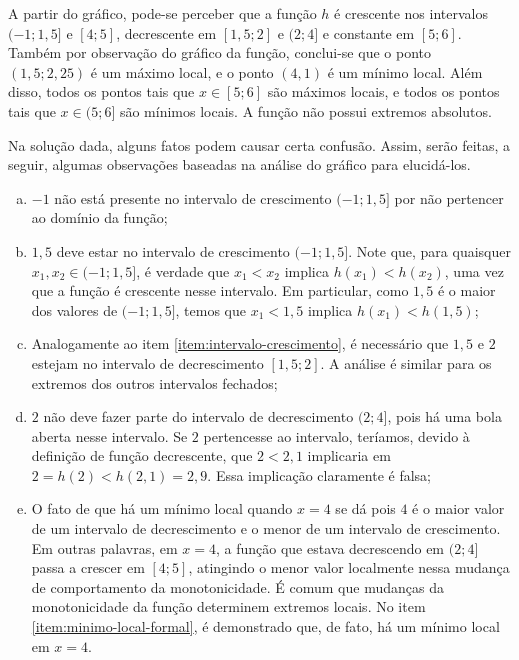 \begin{solution}
	A partir do gráfico, pode-se perceber que a função $h$ é crescente nos intervalos $(-1;1{,}5]$ e $[4;5]$,
	decrescente em $[1,5; 2]$ e $(2;4]$ e constante em $[5;6]$.     
	Também por observação do gráfico da função, conclui-se que o ponto $(1{,}5; 2{,}25)$ é um máximo local,
	e o ponto $(4,1)$ é um mínimo local. 
	Além disso, todos os pontos tais que $x \in [5;6]$ são máximos locais,
	e todos os pontos tais que $x \in (5; 6]$ são mínimos locais.
	A função não possui extremos absolutos.

	Na solução dada, alguns fatos podem causar certa confusão. 
	Assim, serão feitas, a seguir, algumas observações baseadas na análise do gráfico para elucidá-los.
	\begin{enumerate}[(a)]
		\item $-1$ não está presente no intervalo de crescimento $(-1;1{,}5]$ por não pertencer ao domínio da função;
		\item \label{item:intervalo-crescimento} $1{,}5$ deve estar no intervalo de crescimento $(-1;1{,}5]$. 
		Note que, para quaisquer $x_1, x_2 \in (-1;1{,}5]$, é verdade que $x_1 < x_2$ implica $h(x_1) < h(x_2)$,
		uma vez que a função é crescente nesse intervalo. 
		Em particular, como $1{,}5$ é o maior dos valores de $(-1;1{,}5]$, 
		temos que $x_1 < 1{,}5$ implica $h(x_1) < h(1{,}5)$;
		\item Analogamente ao item \ref{item:intervalo-crescimento},
		é necessário que $1{,}5$ e $2$ estejam no intervalo de decrescimento $[1,5; 2]$.
		A análise é similar para os extremos dos outros intervalos fechados;
		\item $2$ não deve fazer parte do intervalo de decrescimento $(2; 4]$, 
		pois há uma bola aberta nesse intervalo. 
		Se $2$ pertencesse ao intervalo, teríamos, devido à definição de função decrescente,
		que $2<2{,}1$ implicaria em $2 = h(2) < h(2{,}1) = 2{,}9$. 
		Essa implicação claramente é falsa;
		\item \label{item:minimo-local} O fato de que há um mínimo local quando $x = 4$ se dá pois $4$ é o maior valor de um intervalo de decrescimento e o menor de um intervalo de crescimento. 
		Em outras palavras, em $x=4$, a função que estava decrescendo em $(2;4]$ passa a crescer em $[4;5]$,
		atingindo o menor valor localmente nessa mudança de comportamento da monotonicidade. 
		É comum que mudanças da monotonicidade da função determinem extremos locais.
		No item \ref{item:minimo-local-formal}, é demonstrado que, de fato, há um mínimo local em $x=4$.

\end{enumerate}
\end{solution}
